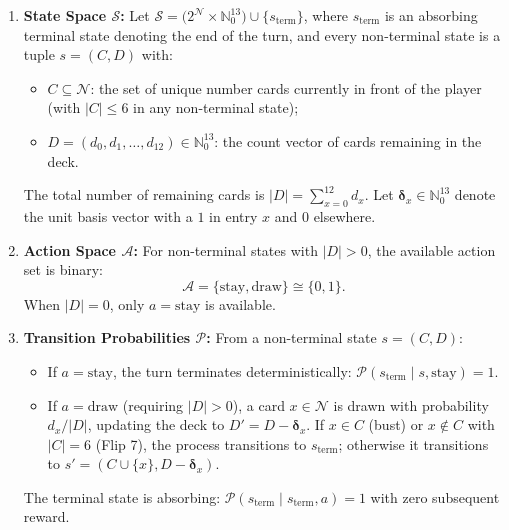 \documentclass{article}
\theoremstyle{plain}
\theoremstyle{definition}
\theoremstyle{remark}
\begin{document}
\begin{enumerate}
    \item \textbf{State Space $\mathcal{S}$:} Let $\mathcal{S} = \big(2^{\mathcal{N}} \times \mathbb{N}_0^{13}\big) \cup \{s_{\text{term}}\}$, where $s_{\text{term}}$ is an absorbing terminal state denoting the end of the turn, and every non-terminal state is a tuple $s = (C, D)$ with:
    \begin{itemize}
        \item $C \subseteq \mathcal{N}$: the set of unique number cards currently in front of the player (with $|C| \le 6$ in any non-terminal state);
        \item $D = (d_0, d_1, \dots, d_{12}) \in \mathbb{N}_0^{13}$: the count vector of cards remaining in the deck.
    \end{itemize}
    The total number of remaining cards is $|D| = \sum_{x=0}^{12} d_x$. Let $\boldsymbol{\delta}_x \in \mathbb{N}_0^{13}$ denote the unit basis vector with a $1$ in entry $x$ and $0$ elsewhere.

    \item \textbf{Action Space $\mathcal{A}$:} For non-terminal states with $|D| > 0$, the available action set is binary:
    \[
        \mathcal{A} = \{\text{stay}, \text{draw}\} \cong \{0, 1\}.
    \]
    When $|D| = 0$, only $a = \text{stay}$ is available.

    \item \textbf{Transition Probabilities $\mathcal{P}$:} From a non-terminal state $s = (C, D)$:
    \begin{itemize}
        \item If $a = \text{stay}$, the turn terminates deterministically: $\mathcal{P}(s_{\text{term}} \mid s, \text{stay}) = 1$.
        \item If $a = \text{draw}$ (requiring $|D| > 0$), a card $x \in \mathcal{N}$ is drawn with probability $d_x / |D|$, updating the deck to $D' = D - \boldsymbol{\delta}_x$. If $x \in C$ (bust) or $x \notin C$ with $|C| = 6$ (Flip 7), the process transitions to $s_{\text{term}}$; otherwise it transitions to $s' = (C \cup \{x\}, D - \boldsymbol{\delta}_x)$.
    \end{itemize}
    The terminal state is absorbing: $\mathcal{P}(s_{\text{term}} \mid s_{\text{term}}, a) = 1$ with zero subsequent reward.


\end{enumerate}
\end{document}
